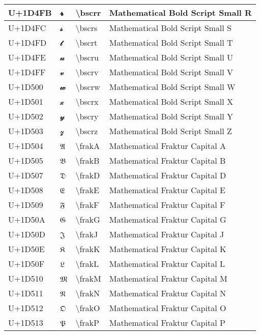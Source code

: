 \begin{table}[h]
\begin{tabulary}{\linewidth}{|L|L|L|L|}
\hline
U+1D4FB & 𝓻 & {\textbackslash}bscrr & Mathematical Bold Script Small R \\
\hline
U+1D4FC & 𝓼 & {\textbackslash}bscrs & Mathematical Bold Script Small S \\
\hline
U+1D4FD & 𝓽 & {\textbackslash}bscrt & Mathematical Bold Script Small T \\
\hline
U+1D4FE & 𝓾 & {\textbackslash}bscru & Mathematical Bold Script Small U \\
\hline
U+1D4FF & 𝓿 & {\textbackslash}bscrv & Mathematical Bold Script Small V \\
\hline
U+1D500 & 𝔀 & {\textbackslash}bscrw & Mathematical Bold Script Small W \\
\hline
U+1D501 & 𝔁 & {\textbackslash}bscrx & Mathematical Bold Script Small X \\
\hline
U+1D502 & 𝔂 & {\textbackslash}bscry & Mathematical Bold Script Small Y \\
\hline
U+1D503 & 𝔃 & {\textbackslash}bscrz & Mathematical Bold Script Small Z \\
\hline
U+1D504 & 𝔄 & {\textbackslash}frakA & Mathematical Fraktur Capital A \\
\hline
U+1D505 & 𝔅 & {\textbackslash}frakB & Mathematical Fraktur Capital B \\
\hline
U+1D507 & 𝔇 & {\textbackslash}frakD & Mathematical Fraktur Capital D \\
\hline
U+1D508 & 𝔈 & {\textbackslash}frakE & Mathematical Fraktur Capital E \\
\hline
U+1D509 & 𝔉 & {\textbackslash}frakF & Mathematical Fraktur Capital F \\
\hline
U+1D50A & 𝔊 & {\textbackslash}frakG & Mathematical Fraktur Capital G \\
\hline
U+1D50D & 𝔍 & {\textbackslash}frakJ & Mathematical Fraktur Capital J \\
\hline
U+1D50E & 𝔎 & {\textbackslash}frakK & Mathematical Fraktur Capital K \\
\hline
U+1D50F & 𝔏 & {\textbackslash}frakL & Mathematical Fraktur Capital L \\
\hline
U+1D510 & 𝔐 & {\textbackslash}frakM & Mathematical Fraktur Capital M \\
\hline
U+1D511 & 𝔑 & {\textbackslash}frakN & Mathematical Fraktur Capital N \\
\hline
U+1D512 & 𝔒 & {\textbackslash}frakO & Mathematical Fraktur Capital O \\
\hline
U+1D513 & 𝔓 & {\textbackslash}frakP & Mathematical Fraktur Capital P \\

\end{tabulary}
\end{table}
